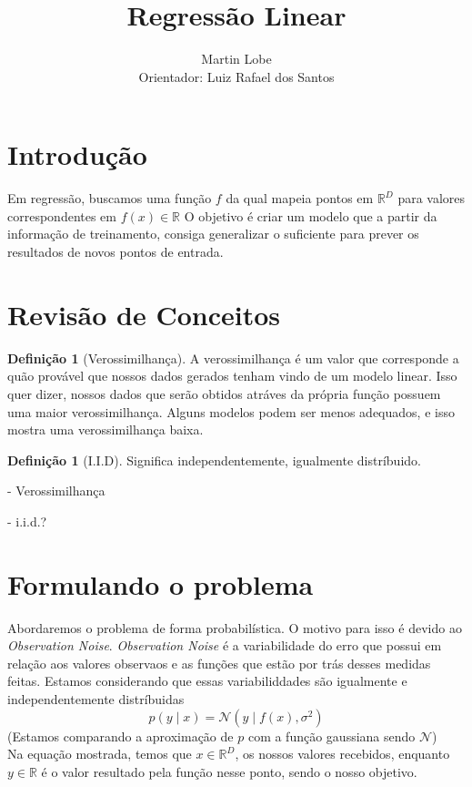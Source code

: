 \documentclass[a4paper, 12pt]{scrartcl}
\title{Regressão Linear}
\author{Martin Lobe \\ Orientador: Luiz Rafael dos Santos}
\date{}
\theoremstyle{plain}%
\theoremstyle{definition}
\newtheorem{defin}[teo]{Definição}
\theoremstyle{remark}
\def \Real {\mathds{R}}
\begin{document}
\onehalfspacing
\maketitle
 
\section*{Introdução}

Em regressão, buscamos uma função $f$ da qual mapeia pontos em $\Real^D$ para valores correspondentes em $f(x) \in \Real$
O objetivo é criar um modelo que a partir da informação de treinamento, consiga generalizar o suficiente para prever os resultados de novos pontos de entrada.

\section{Revisão de Conceitos}

\begin{defin}[Verossimilhança]
    A verossimilhança é um valor que corresponde a quão provável que nossos dados gerados tenham vindo de um modelo linear. 
    Isso quer dizer, nossos dados que serão obtidos atráves da própria função possuem uma maior verossimilhança. Alguns modelos podem ser menos adequados, e isso mostra uma verossimilhança baixa.
\end{defin}

\begin{defin}[I.I.D]
    Significa independentemente, igualmente distríbuido.
\end{defin}

- Verossimilhança

- i.i.d.?




\section{Formulando o problema}
Abordaremos o problema de forma probabilística. O motivo para isso é devido ao \textit{Observation Noise}.
\textit{Observation Noise} é a variabilidade do erro que possui em relação aos valores observaos e as funções que estão por trás desses medidas feitas. 
Estamos considerando que essas variabiliddades são igualmente e independentemente distríbuidas
\[
    p(y\mid x) = \mathcal{N}(y\mid f(x), \sigma^2)
\]
(Estamos comparando a aproximação de $p$ com a função gaussiana sendo $\mathcal{N}$)
\\
Na equação mostrada, temos que $x \in \Real^D$, os nossos valores recebidos, enquanto $y \in \Real$ é o valor resultado pela função nesse ponto, sendo o nosso objetivo.
\end{document}

